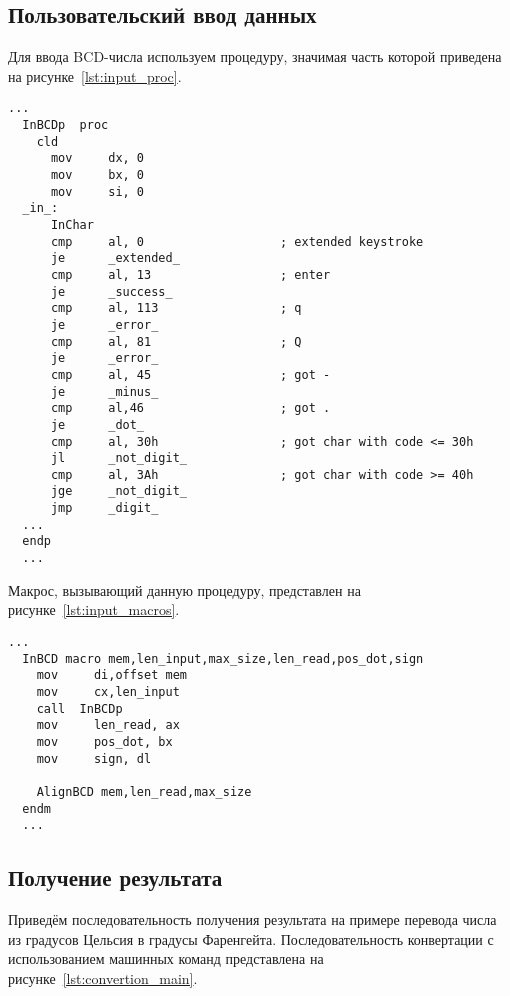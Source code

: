 \subsection{Пользовательский ввод данных}

Для ввода BCD-числа используем процедуру, значимая часть которой
приведена на рисунке~\ref{lst:input_proc}.

\begin{lstlisting}[caption={Часть процедуры, используемой для пользователького ввода данных},
label=lst:input_proc,language={[x86masm]Assembler},basicstyle=\scriptsize\ttfamily]
  ...
  InBCDp  proc
    cld
      mov     dx, 0
      mov     bx, 0
      mov     si, 0
  _in_:
      InChar
      cmp     al, 0                   ; extended keystroke
      je      _extended_
      cmp     al, 13                  ; enter
      je      _success_
      cmp     al, 113                 ; q
      je      _error_
      cmp     al, 81                  ; Q
      je      _error_
      cmp     al, 45                  ; got -
      je      _minus_
      cmp     al,46                   ; got .
      je      _dot_
      cmp     al, 30h                 ; got char with code <= 30h
      jl      _not_digit_
      cmp     al, 3Ah                 ; got char with code >= 40h
      jge     _not_digit_
      jmp     _digit_
  ...
  endp
  ...
\end{lstlisting}

Макрос, вызывающий данную процедуру, представлен на рисунке~\ref{lst:input_macros}.

\begin{lstlisting}[caption={Макрос, вызывающий процедуру пользователького ввода данных},
label=lst:input_macros,language={[x86masm]Assembler},basicstyle=\scriptsize\ttfamily]
  ...
  InBCD macro mem,len_input,max_size,len_read,pos_dot,sign
    mov     di,offset mem
    mov     cx,len_input
    call  InBCDp
    mov     len_read, ax
    mov     pos_dot, bx
    mov     sign, dl

    AlignBCD mem,len_read,max_size
  endm
  ...
\end{lstlisting}

\subsection{Получение результата}

Приведём последовательность получения результата на примере перевода числа из
градусов Цельсия в градусы Фаренгейта. Последовательность конвертации с использованием
машинных команд представлена на рисунке~\ref{lst:convertion_main}.

